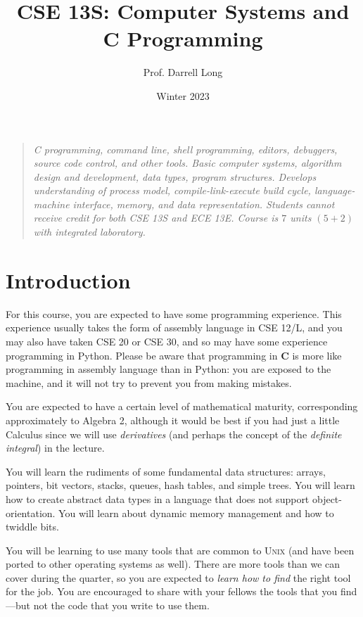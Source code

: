 \documentclass[11pt]{article}
\title{CSE 13S: Computer Systems and \textbf{C} Programming}
\author{Prof.\xspace Darrell Long}
\date{Winter 2023}
\begin{document}
\maketitle
\begin{quotation}
\emph{
C programming, command line, shell programming, editors, debuggers,
source code control, and other tools. Basic computer systems,
algorithm design and development, data types, program structures.
Develops understanding of process model, compile-link-execute build
cycle, language-machine interface, memory, and data representation.
Students cannot receive credit for both CSE 13S and ECE 13E. Course
is $7$ units $(5 + 2)$ with integrated laboratory.
}
\end{quotation}

\section{Introduction}

For this course, you are expected to have some programming experience.
This experience usually takes the form of assembly language in CSE
12/L, and you may also have taken CSE 20 or CSE 30, and so may have
some experience programming in Python. Please be aware that programming
in \textbf{C} is more like programming in assembly language than
in Python: you are exposed to the machine, and it will not try to
prevent you from making mistakes.

You are expected to have a certain level of mathematical maturity,
corresponding approximately to Algebra 2, although it would be best
if you had just a little Calculus since we will use \emph{derivatives}
(and perhaps the concept of the \emph{definite integral}) in the
lecture.

You will learn the rudiments of some fundamental data structures:
arrays, pointers, bit vectors, stacks, queues, hash tables, and simple
trees. You will learn how to create abstract data types in a language
that does not support object-orientation. You will learn about dynamic
memory management and how to twiddle bits.

You will be learning to use many tools that are common to \textsc{Unix}
(and have been ported to other operating systems as well). There are
more tools than we can cover during the quarter, so you are expected to
\emph{learn how to find} the right tool for the job. You are encouraged to
share with your fellows the tools that you find---but not the code that
you write to use them.
\end{document}
